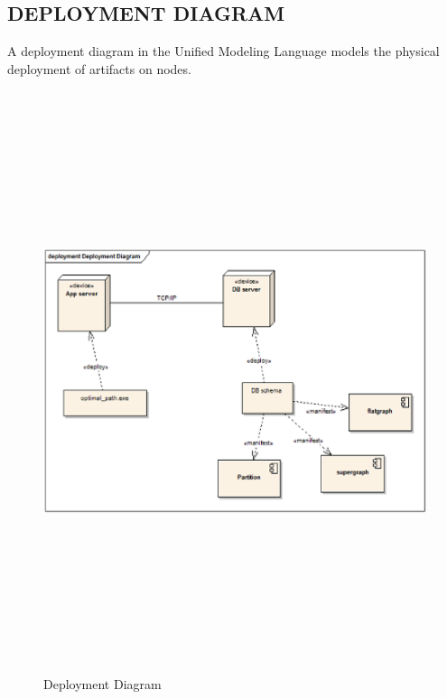 \begin{center}
\section{\normalsize DEPLOYMENT DIAGRAM}
\hspace{5mm} A deployment diagram in the Unified Modeling Language models the physical deployment of artifacts on nodes.
\begin{figure}[H]
\includegraphics[width=17cm,height=17cm]{dep.eps}
\caption{Deployment Diagram}
\end{figure}



\end{center}